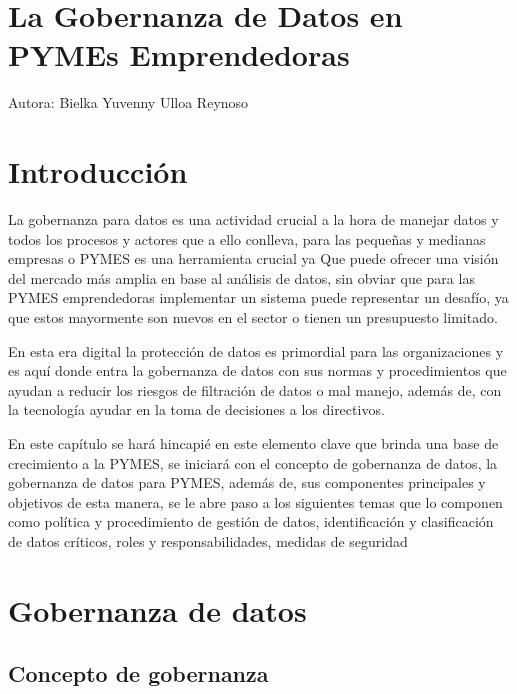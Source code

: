 \documentclass[
  letterpaper,
  DIV=11,
  numbers=noendperiod]{scrreprt}
\begin{document}
\hypertarget{la-gobernanza-de-datos-en-pymes-emprendedoras}{%
\chapter{La Gobernanza de Datos en PYMEs
Emprendedoras}\label{la-gobernanza-de-datos-en-pymes-emprendedoras}}

Autora: Bielka Yuvenny Ulloa Reynoso


\hypertarget{introducciuxf3n-3}{%
\chapter{Introducción}\label{introducciuxf3n-3}}

La gobernanza para datos es una actividad crucial a la hora de manejar
datos y todos los procesos y actores que a ello conlleva, para las
pequeñas y medianas empresas o PYMES es una herramienta crucial ya Que
puede ofrecer una visión del mercado más amplia en base al análisis de
datos, sin obviar que para las PYMES emprendedoras implementar un
sistema puede representar un desafío, ya que estos mayormente son nuevos
en el sector o tienen un presupuesto limitado.

En esta era digital la protección de datos es primordial para las
organizaciones y es aquí donde entra la gobernanza de datos con sus
normas y procedimientos que ayudan a reducir los riesgos de filtración
de datos o mal manejo, además de, con la tecnología ayudar en la toma de
decisiones a los directivos.

En este capítulo se hará hincapié en este elemento clave que brinda una
base de crecimiento a la PYMES, se iniciará con el concepto de
gobernanza de datos, la gobernanza de datos para PYMES, además de, sus
componentes principales y objetivos de esta manera, se le abre paso a
los siguientes temas que lo componen como política y procedimiento de
gestión de datos, identificación y clasificación de datos críticos,
roles y responsabilidades, medidas de seguridad


\hypertarget{gobernanza-de-datos}{%
\chapter{Gobernanza de datos}\label{gobernanza-de-datos}}

\hypertarget{concepto-de-gobernanza}{%
\section{Concepto de gobernanza}\label{concepto-de-gobernanza}}
\end{document}
